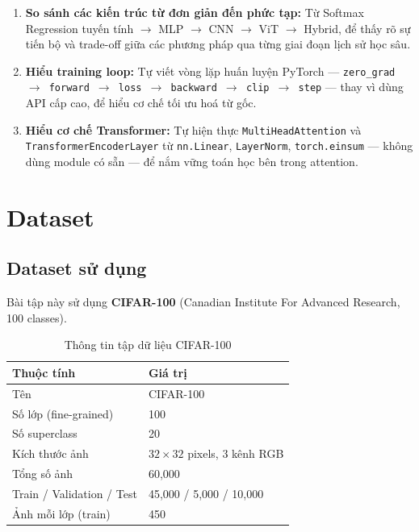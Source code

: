 \documentclass[12pt, a4paper]{article}
\begin{document}
\begin{enumerate}
  \item \textbf{So sánh các kiến trúc từ đơn giản đến phức tạp:} Từ Softmax Regression tuyến tính $\rightarrow$ MLP $\rightarrow$ CNN $\rightarrow$ ViT $\rightarrow$ Hybrid, để thấy rõ sự tiến bộ và trade-off giữa các phương pháp qua từng giai đoạn lịch sử học sâu.

  \item \textbf{Hiểu training loop:} Tự viết vòng lặp huấn luyện PyTorch --- \texttt{zero\_grad $\rightarrow$ forward $\rightarrow$ loss $\rightarrow$ backward $\rightarrow$ clip $\rightarrow$ step} --- thay vì dùng API cấp cao, để hiểu cơ chế tối ưu hoá từ gốc.

  \item \textbf{Hiểu cơ chế Transformer:} Tự hiện thực \texttt{MultiHeadAttention} và \texttt{TransformerEncoderLayer} từ \texttt{nn.Linear}, \texttt{LayerNorm}, \texttt{torch.einsum} --- không dùng module có sẵn --- để nắm vững toán học bên trong attention.
\end{enumerate}

\section{Dataset}

\subsection{Dataset sử dụng}

Bài tập này sử dụng \textbf{CIFAR-100} (Canadian Institute For Advanced Research, 100 classes).

\begin{table}[H]
\centering
\caption{Thông tin tập dữ liệu CIFAR-100}
\begin{tabular}{ll}
\toprule
\textbf{Thuộc tính} & \textbf{Giá trị} \\
\midrule
Tên               & CIFAR-100 \\
Số lớp (fine-grained) & 100 \\
Số superclass     & 20 \\
Kích thước ảnh    & $32 \times 32$ pixels, 3 kênh RGB \\
Tổng số ảnh       & 60,000 \\
Train / Validation / Test & 45,000 / 5,000 / 10,000 \\
Ảnh mỗi lớp (train) & 450 \\
\bottomrule
\end{tabular}
\end{table}
\end{document}
